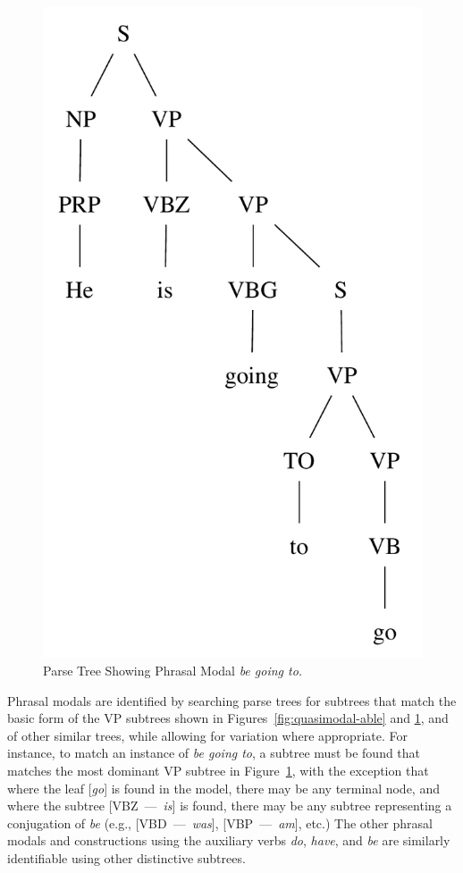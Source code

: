 \documentclass[main.tex]{subfiles}
\begin{document}
\begin{figure}[htbp]
\centering
\includegraphics[scale=0.6]{modal-going.pdf}
\caption{Parse Tree Showing Phrasal Modal \textit{be going to.}}
\label{fig:quasimodal-going}
\end{figure}

Phrasal modals are identified by searching parse trees for subtrees that match the basic form of the VP subtrees shown in Figures~\ref{fig:quasimodal-able} and \ref{fig:quasimodal-going}, and of other similar trees, while allowing for variation where appropriate. For instance, to match an instance of \textit{be going to}, a subtree must be found that matches the most dominant VP subtree in Figure~\ref{fig:quasimodal-going}, with the exception that where the leaf [\textit{go}] is found in the model, there may be any terminal node, and where the subtree [VBZ~---~\textit{is}] is found, there may be any subtree representing a conjugation of \textit{be} (e.g., [VBD~---~\textit{was}], [VBP~---~\textit{am}], etc.) The other phrasal modals and constructions using the auxiliary verbs \textit{do}, \textit{have}, and \textit{be} are similarly identifiable using other distinctive subtrees.
\end{document}
